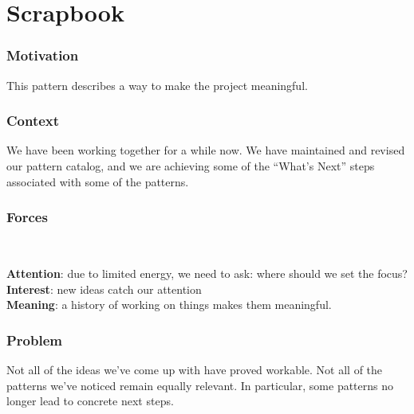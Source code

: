 \section{Scrapbook} \label{sec:Scrapbook}

\subsubsection*{Motivation} This pattern describes a way to make the project meaningful.  

\subsubsection*{Context} We have been working together for a while now.
We have maintained and revised our pattern catalog, and we are
achieving some of the ``What's Next'' steps associated with some of
the patterns.

\subsubsection*{Forces}~
\parbox[t]{.85\textwidth}{
\textbf{Attention}: due to limited energy, we need to ask: where should we set the focus?\\
\textbf{Interest}: new ideas catch our attention\\
\textbf{Meaning}: a history of working on things makes them meaningful.
}

\subsubsection*{Problem} Not all of the ideas we've come up with have proved workable.
Not all of the patterns we've noticed remain equally relevant.
In particular, some patterns no longer lead to concrete next steps.

